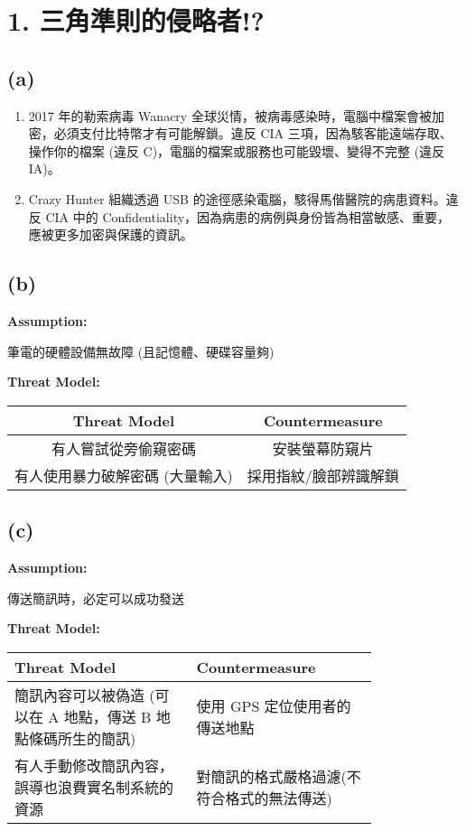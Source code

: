 \documentclass[12pt]{article}
\title{\mytitle}
\author{\textbf{\myauthor}}
\date{\today}
\begin{document}
\maketitle

\section*{1. 三角準則的侵略者!?}
\subsection*{(a)}
\begin{enumerate}
    \item 2017 年的勒索病毒 Wanacry 全球災情，被病毒感染時，電腦中檔案會被加密，必須支付比特幣才有可能解鎖。違反 CIA 三項，因為駭客能遠端存取、操作你的檔案 (違反 C)，電腦的檔案或服務也可能毀壞、變得不完整 (違反 IA)。
    \item Crazy Hunter 組織透過 USB 的途徑感染電腦，駭得馬偕醫院的病患資料。違反 CIA 中的 Confidentiality，因為病患的病例與身份皆為相當敏感、重要，應被更多加密與保護的資訊。
\end{enumerate}
\subsection*{(b)}
\noindent \textbf{Assumption:}

\noindent 筆電的硬體設備無故障 (且記憶體、硬碟容量夠)

\noindent \textbf{Threat Model:}

\begin{center}
\begin{tabular}{ |c|c| } 
 \hline
 Threat Model & Countermeasure \\
 \hline
 有人嘗試從旁偷窺密碼 & 安裝螢幕防窺片 \\ 
 \hline
 有人使用暴力破解密碼 (大量輸入) & 採用指紋/臉部辨識解鎖 \\ 
 \hline
\end{tabular}
\end{center}
\subsection*{(c)}
\noindent \textbf{Assumption:}

\noindent 傳送簡訊時，必定可以成功發送

\noindent \textbf{Threat Model:}

\begin{center}
\begin{tabular}{ |p{0.4\linewidth}|p{0.4\linewidth}| } 
 \hline
 Threat Model & Countermeasure \\
 \hline
 簡訊內容可以被偽造 (可以在 A 地點，傳送 B 地點條碼所生的簡訊) & 使用 GPS 定位使用者的傳送地點 \\ 
 \hline
 有人手動修改簡訊內容，誤導也浪費實名制系統的資源 & 對簡訊的格式嚴格過濾(不符合格式的無法傳送) \\ 
 \hline
\end{tabular}
\end{center}
\end{document}
